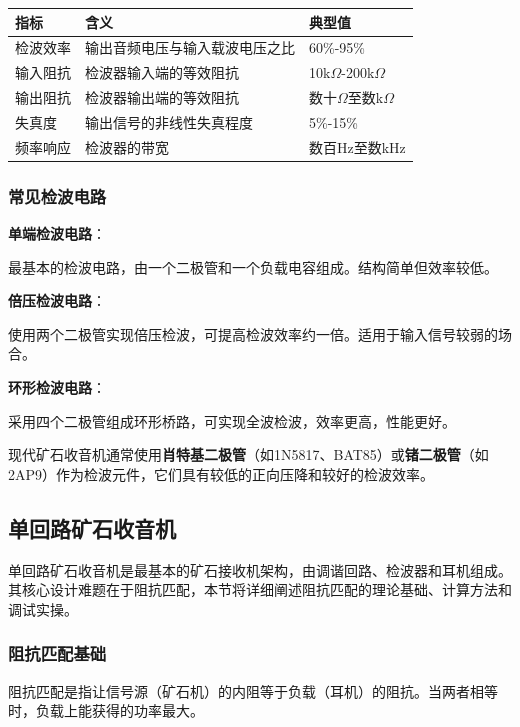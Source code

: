 \begin{center}
\begin{tabular}{|p{3cm}|p{4cm}|p{5cm}|}
\hline
\textbf{指标} & \textbf{含义} & \textbf{典型值} \\
\hline
检波效率 & 输出音频电压与输入载波电压之比 & 60\%-95\% \\
输入阻抗 & 检波器输入端的等效阻抗 & 10k$\Omega$-200k$\Omega$ \\
输出阻抗 & 检波器输出端的等效阻抗 & 数十$\Omega$至数k$\Omega$ \\
失真度 & 输出信号的非线性失真程度 & 5\%-15\% \\
频率响应 & 检波器的带宽 & 数百Hz至数kHz \\
\hline
\end{tabular}
\end{center}

\subsubsection{常见检波电路}
\label{sec:detector_circuits}

\textbf{单端检波电路}：

最基本的检波电路，由一个二极管和一个负载电容组成。结构简单但效率较低。

\textbf{倍压检波电路}：

使用两个二极管实现倍压检波，可提高检波效率约一倍。适用于输入信号较弱的场合。

\textbf{环形检波电路}：

采用四个二极管组成环形桥路，可实现全波检波，效率更高，性能更好。

现代矿石收音机通常使用\textbf{肖特基二极管}（如1N5817、BAT85）或\textbf{锗二极管}（如2AP9）作为检波元件，它们具有较低的正向压降和较好的检波效率。

\subsection{单回路矿石收音机}
\label{sec:single_loop_crystal_radio}

单回路矿石收音机是最基本的矿石接收机架构，由调谐回路、检波器和耳机组成。其核心设计难题在于阻抗匹配，本节将详细阐述阻抗匹配的理论基础、计算方法和调试实操。

\subsubsection{阻抗匹配基础}
\label{sec:impedance_matching_fundamentals}

阻抗匹配是指让信号源（矿石机）的内阻等于负载（耳机）的阻抗。当两者相等时，负载上能获得的功率最大。


